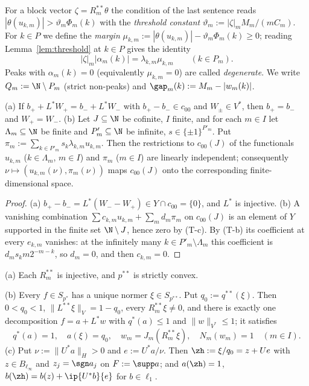 For a block vector $\zeta=R_m^{**}\theta$ the condition of the last
sentence reads $|\theta(u_{k,m})|>\vartheta_m\Phi_m(k)$ with the
\emph{threshold constant} $\vartheta_m:=|\zeta|_mM_m/(mC_m)$.  For $k\in P$
we define the \emph{margin}
$\mu_{k,m}:=|\theta(u_{k,m})|-\vartheta_m\Phi_m(k)\ge0$; reading
Lemma~\ref{lem:threshold} at $k\in P$ gives the identity
\begin{equation}\label{eq:margin}
 |\zeta|_m|\alpha_m(k)|=\lambda_{k,m}\mu_{k,m}\qquad(k\in P_m).
\end{equation}
Peaks with $\alpha_m(k)=0$ (equivalently $\mu_{k,m}=0$) are called
\emph{degenerate}.  We write $Q_m:=\N\setminus P_m$ (strict non-peaks) and
$\gap_m(k):=M_m-|w_m(k)|$.

\begin{lemma}\label{lem:rigidity}
\textup{(a)} If $b_++L^*W_+=b_-+L^*W_-$ with $b_+-b_-\in c_{00}$ and
$W_\pm\in V^*$, then $b_+=b_-$ and $W_+=W_-$.
\textup{(b)} Let $J\subseteq\N$ be cofinite, $I$ finite, and for each
$m\in I$ let $\Lambda_m\subseteq\N$ be finite and $P_m'\subseteq\N$ be
infinite, $s\in\{\pm1\}^{P'_m}$.  Put
$\pi_m:=\sum_{k\in P'_m}s_k\lambda_{k,m}u_{k,m}$.  Then the restrictions to
$c_{00}(J)$ of the functionals $u_{k,m}$ \textup{(}$k\in\Lambda_m$,
$m\in I$\textup{)} and $\pi_m$ \textup{(}$m\in I$\textup{)} are linearly
independent; consequently $\nu\mapsto(u_{k,m}(\nu),\pi_m(\nu))$ maps
$c_{00}(J)$ onto the corresponding finite-dimensional space.
\end{lemma}

\begin{proof}
(a) $b_+-b_-=L^*(W_--W_+)\in Y\cap c_{00}=\{0\}$, and $L^*$ is injective.
(b) A vanishing combination
$\sum c_{k,m}u_{k,m}+\sum_md_m\pi_m$ on $c_{00}(J)$ is an element of $Y$
supported in the finite set $\N\setminus J$, hence zero by (T-c).  By
(T-b) its coefficient at every $e_{k,m}$ vanishes: at the infinitely many
$k\in P'_m\setminus\Lambda_m$ this coefficient is $d_ms_km2^{-m-k}$, so
$d_m=0$, and then $c_{k,m}=0$.
\end{proof}

\begin{proposition}\label{prop:forced}
\textup{(a)} Each $R_m^{**}$ is injective, and $p^{**}$ is strictly convex.

\textup{(b)} Every $f\in S_{p^*}$ has a unique normer $\xi\in S_{p^{**}}$.
Put $q_0:=q^{**}(\xi)$.  Then $0<q_0<1$, $\|L^{**}\xi\|_V=1-q_0$, every
$R_m^{**}\xi\ne0$, and there is exactly one decomposition $f=a+L^*w$ with
$q^*(a)\le1$ and $\|w\|_{V^*}\le1$; it satisfies
\[
 q^*(a)=1,\quad a(\xi)=q_0,\quad w_m=J_m(R_m^{**}\xi),\quad N_m(w_m)=1
 \quad(m\in I).
\]
\textup{(c)} Put $\nu:=\|U^*a\|_H>0$ and $e:=U^*a/\nu$.  Then
$\zh:=\xi/q_0=z+Ue$ with $z\in B_{\ell_\infty}$ and $z_j=\sgn a_j$ on
$F:=\supp a$; and $a(\zh)=1$, $b(\zh)=b(z)+\ip{U^*b}{e}$ for
$b\in\ell_1$.
\end{proposition}

